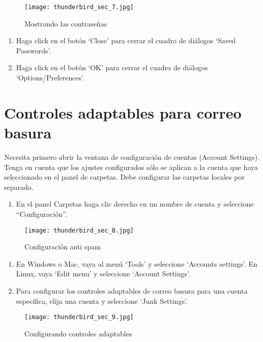 \documentclass[10pt,a5paper,twoside,,]{book}
\providecommand{\tightlist}{%
  \setlength{\itemsep}{0pt}\setlength{\parskip}{0pt}}
\begin{document}
\begin{figure}[htbp]
\centering
\texttt{[image: thunderbird\_sec\_7.jpg]}
\caption{Mostrando las contraseñas}
\end{figure}

\begin{enumerate}
\def\labelenumi{\arabic{enumi}.}
\setcounter{enumi}{6}
\tightlist
\item
  Haga click en el botón `Close' para cerrar el cuadro de diálogos
  `Saved Passwords'.
\item
  Haga click en el botón `OK' para cerrar el cuadro de diálogos
  `Options/Preferences'.
\end{enumerate}

\section{Controles adaptables para correo
basura}\label{controles-adaptables-para-correo-basura}

Necesita primero abrir la ventana de configuración de cuentas (Account
Settings). Tenga en cuenta que los ajustes configurados sólo se aplican
a la cuenta que haya seleccionado en el panel de carpetas. Debe
configurar las carpetas locales por separado.

\begin{enumerate}
\def\labelenumi{\arabic{enumi}.}
\tightlist
\item
  En el panel Carpetas haga clic derecho en un nombre de cuenta y
  seleccione ``Configuración''.
\end{enumerate}

\begin{figure}[htbp]
\centering
\texttt{[image: thunderbird\_sec\_8.jpg]}
\caption{Configuración anti spam}
\end{figure}

\begin{enumerate}
\def\labelenumi{\arabic{enumi}.}
\setcounter{enumi}{1}
\item
  En Windows o Mac, vaya al menú `Tools' y seleccione `Accounts
  settings'. En Linux, vaya `Edit menu' y seleccione `Account Settings'.
\item
  Para configurar los controles adaptables de correo basura para una
  cuenta específica, elija una cuenta y seleccione `Junk Settings'.
\end{enumerate}

\begin{figure}[htbp]
\centering
\texttt{[image: thunderbird\_sec\_9.jpg]}
\caption{Configurando controles adaptables}
\end{figure}
\end{document}
